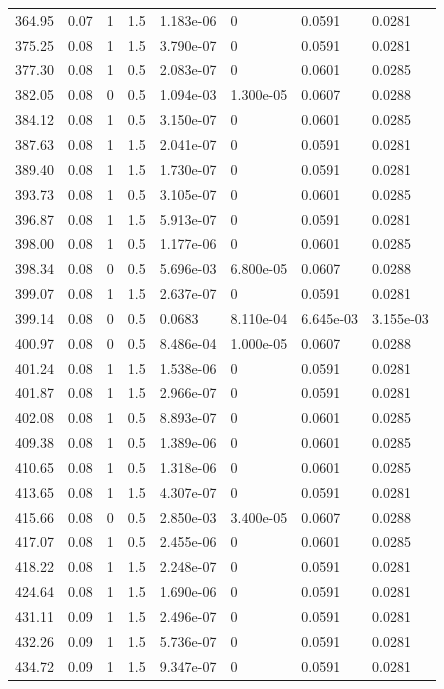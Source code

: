 \documentclass[preview]{standalone}
\begin{document}
{{{\begin{tabular}{L{1.2cm}C{1.2cm} C{0.3cm}C{0.5cm} C{1.4cm}C{1.4cm} C{1.4cm}C{1.4cm}}
  364.95  &  0.07  & 1     & 1.5 &  1.183e-06  & 0  & 0.0591 &  0.0281   \\ 
  375.25  &  0.08  & 1     & 1.5 &  3.790e-07  & 0  & 0.0591 &  0.0281   \\ 
  377.30  &  0.08  & 1     & 0.5 &  2.083e-07  & 0  & 0.0601 &  0.0285   \\ 
  382.05  &  0.08  & 0     & 0.5 &  1.094e-03  & 1.300e-05  & 0.0607 &  0.0288   \\ 
  384.12  &  0.08  & 1     & 0.5 &  3.150e-07  & 0  & 0.0601 &  0.0285   \\ 
  387.63  &  0.08  & 1     & 1.5 &  2.041e-07  & 0  & 0.0591 &  0.0281   \\ 
  389.40  &  0.08  & 1     & 1.5 &  1.730e-07  & 0  & 0.0591 &  0.0281   \\ 
  393.73  &  0.08  & 1     & 0.5 &  3.105e-07  & 0  & 0.0601 &  0.0285   \\ 
  396.87  &  0.08  & 1     & 1.5 &  5.913e-07  & 0  & 0.0591 &  0.0281   \\ 
  398.00  &  0.08  & 1     & 0.5 &  1.177e-06  & 0  & 0.0601 &  0.0285   \\ 
  398.34  &  0.08  & 0     & 0.5 &  5.696e-03  & 6.800e-05  & 0.0607 &  0.0288   \\ 
  399.07  &  0.08  & 1     & 1.5 &  2.637e-07  & 0  & 0.0591 &  0.0281   \\ 
  399.14  &  0.08  & 0     & 0.5 &  0.0683  & 8.110e-04  & 6.645e-03 &  3.155e-03   \\ 
  400.97  &  0.08  & 0     & 0.5 &  8.486e-04  & 1.000e-05  & 0.0607 &  0.0288   \\ 
  401.24  &  0.08  & 1     & 1.5 &  1.538e-06  & 0  & 0.0591 &  0.0281   \\ 
  401.87  &  0.08  & 1     & 1.5 &  2.966e-07  & 0  & 0.0591 &  0.0281   \\ 
  402.08  &  0.08  & 1     & 0.5 &  8.893e-07  & 0  & 0.0601 &  0.0285   \\ 
  409.38  &  0.08  & 1     & 0.5 &  1.389e-06  & 0  & 0.0601 &  0.0285   \\ 
  410.65  &  0.08  & 1     & 0.5 &  1.318e-06  & 0  & 0.0601 &  0.0285   \\ 
  413.65  &  0.08  & 1     & 1.5 &  4.307e-07  & 0  & 0.0591 &  0.0281   \\ 
  415.66  &  0.08  & 0     & 0.5 &  2.850e-03  & 3.400e-05  & 0.0607 &  0.0288   \\ 
  417.07  &  0.08  & 1     & 0.5 &  2.455e-06  & 0  & 0.0601 &  0.0285   \\ 
  418.22  &  0.08  & 1     & 1.5 &  2.248e-07  & 0  & 0.0591 &  0.0281   \\ 
  424.64  &  0.08  & 1     & 1.5 &  1.690e-06  & 0  & 0.0591 &  0.0281   \\ 
  431.11  &  0.09  & 1     & 1.5 &  2.496e-07  & 0  & 0.0591 &  0.0281   \\ 
  432.26  &  0.09  & 1     & 1.5 &  5.736e-07  & 0  & 0.0591 &  0.0281   \\ 
  434.72  &  0.09  & 1     & 1.5 &  9.347e-07  & 0  & 0.0591 &  0.0281   \\ 
\hline 
\end{tabular} 

}}}
\end{document}
